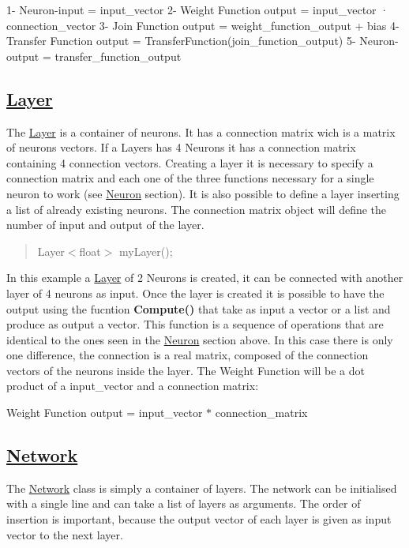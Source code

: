 1-\/ Neuron-\/input = input\-\_\-vector 2-\/ Weight Function output = input\-\_\-vector · connection\-\_\-vector 3-\/ Join Function output = weight\-\_\-function\-\_\-output + bias 4-\/ Transfer Function output = Transfer\-Function(join\-\_\-function\-\_\-output) 5-\/ Neuron-\/output = transfer\-\_\-function\-\_\-output

\subsection*{\hyperlink{class_layer}{Layer} }

The \hyperlink{class_layer}{Layer} is a container of neurons. It has a connection matrix wich is a matrix of neurons vectors. If a Layers has 4 Neurons it has a connection matrix containing 4 connection vectors. Creating a layer it is necessary to specify a connection matrix and each one of the three functions necessary for a single neuron to work (see \hyperlink{class_neuron}{Neuron} section). It is also possible to define a layer inserting a list of already existing neurons. The connection matrix object will define the number of input and output of the layer.

\begin{quotation}


Layer$<$float$>$ my\-Layer();

\end{quotation}


In this example a \hyperlink{class_layer}{Layer} of 2 Neurons is created, it can be connected with another layer of 4 neurons as input. Once the layer is created it is possible to have the output using the fucntion {\bfseries Compute()} that take as input a vector or a list and produce as output a vector. This function is a sequence of operations that are identical to the ones seen in the \hyperlink{class_neuron}{Neuron} section above. In this case there is only one difference, the connection is a real matrix, composed of the connection vectors of the neurons inside the layer. The Weight Function will be a dot product of a input\-\_\-vector and a connection matrix\-:


\begin{DoxyItemize}
\item Weight Function output = input\-\_\-vector $\ast$ connection\-\_\-matrix
\end{DoxyItemize}

\subsection*{\hyperlink{class_network}{Network} }

The \hyperlink{class_network}{Network} class is simply a container of layers. The network can be initialised with a single line and can take a list of layers as arguments. The order of insertion is important, because the output vector of each layer is given as input vector to the next layer. 